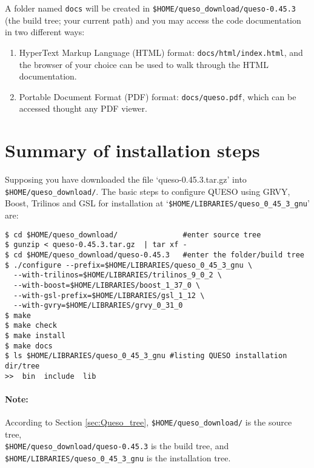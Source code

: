 A folder named \verb+docs+ will be created in \verb+$HOME/queso_download/queso-0.45.3+ (the build tree; your current path) and you may access the code documentation in two different ways:
\begin{enumerate}
 \item HyperText Markup Language (HTML)  format: \verb+docs/html/index.html+, and the browser of your choice can be used to walk through the HTML documentation.

\item Portable Document Format (PDF) format: \verb+docs/queso.pdf+, which can be accessed thought any PDF viewer.
\end{enumerate}
% 

\section{Summary of installation steps}\label{sec:summary}


Supposing you have downloaded the file `queso-0.45.3.tar.gz' into \texttt{\$HOME/queso\_download/}.
%
The basic steps to configure QUESO using GRVY, Boost, Trilinos and GSL for installation at `\verb+$HOME/LIBRARIES/queso_0_45_3_gnu+'  are:

\begin{lstlisting}
$ cd $HOME/queso_download/               #enter source tree
$ gunzip < queso-0.45.3.tar.gz  | tar xf -
$ cd $HOME/queso_download/queso-0.45.3   #enter the folder/build tree 
$ ./configure --prefix=$HOME/LIBRARIES/queso_0_45_3_gnu \
  --with-trilinos=$HOME/LIBRARIES/trilinos_9_0_2 \
  --with-boost=$HOME/LIBRARIES/boost_1_37_0 \
  --with-gsl-prefix=$HOME/LIBRARIES/gsl_1_12 \
  --with-gvry=$HOME/LIBRARIES/grvy_0_31_0 
$ make 
$ make check
$ make install 
$ make docs
$ ls $HOME/LIBRARIES/queso_0_45_3_gnu #listing QUESO installation dir/tree
>>  bin  include  lib
\end{lstlisting}

\paragraph*{Note:} According to  Section \ref{sec:Queso_tree}, \texttt{\$HOME/queso\_download/} is the source tree, \\ \verb+$HOME/queso_download/queso-0.45.3+ is the build tree, and \newline
\verb+$HOME/LIBRARIES/queso_0_45_3_gnu+ is the installation tree.


